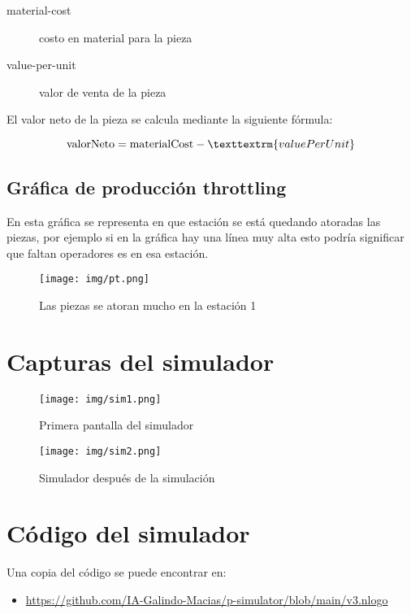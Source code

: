 \documentclass[11pt]{article}
\begin{document}
\begin{description}
\item[{material-cost}] costo en material para la pieza
\item[{value-per-unit}] valor de venta de la pieza
\end{description}

El valor neto de la pieza se calcula mediante la siguiente fórmula:

\[
\textrm{valorNeto} = \textrm{materialCost} - \texttextrm{valuePerUnit}
\]
\subsection{Gráfica de producción throttling}
\label{sec:org66ebd33}
En esta gráfica se representa en que estación se está quedando atoradas las piezas, por ejemplo si en la gráfica hay una línea muy alta esto podría significar que faltan operadores es en esa estación.

\begin{figure}[htbp]
\centering
\texttt{[image: img/pt.png]}
\caption{Las piezas se atoran mucho en la estación 1}
\end{figure}

\section{Capturas del simulador}
\label{sec:orgee2b126}

\begin{figure}[htbp]
\centering
\texttt{[image: img/sim1.png]}
\caption{Primera pantalla del simulador}
\end{figure}

\begin{figure}[htbp]
\centering
\texttt{[image: img/sim2.png]}
\caption{Simulador después de la simulación}
\end{figure}

\section{Código del simulador}
\label{sec:org624f9ef}
Una copia del código se puede encontrar en:
\begin{itemize}
\item \url{https://github.com/IA-Galindo-Macias/p-simulator/blob/main/v3.nlogo}
\end{itemize}
\end{document}
